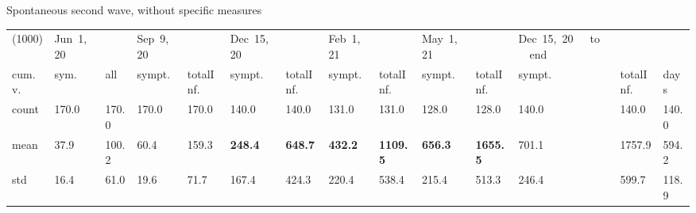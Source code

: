 \documentclass[8pt]{beamer}
\begin{document}
\begin{frame}{Spontaneous second wave, without specific measures}
\begin{table}[H]
\center
\tiny
\begin{tabular}{p{0.4cm}p{0.3cm}p{0.3cm}p{0.3cm}p{0.3cm}p{0.3cm}p{0.3cm}p{0.3cm}p{0.3cm}p{0.3cm}p{0.3cm}p{0.3cm}p{0.3cm}p{0.4cm}}
\toprule
(1000) &  Jun~1,~20 & &  Sep~9,~20 & & Dec~15,~20 & & Feb~1,~21 & & May~1,~21 & & Dec~15,~20~~~to~~~end  \\
cum.~v. &  sym. &  all &  sympt. &  totalInf. &  sympt. &  totalInf. &  sympt. &  totalInf. &  sympt. &  totalInf. &  sympt. &  totalInf.  & days\\
\midrule
count &    170.0 &                      170.0 &    170.0 &                      170.0 &    140.0 &                      140.0 &    131.0 &                      131.0 &    128.0 &                      128.0 &               140.0 &                   140.0 &  140.0 \\
mean  &     37.9 &                      100.2 &     60.4 &                      159.3 &    \textbf{248.4} &                      \textbf{648.7} &    \textbf{432.2} &                     \textbf{1109.5} &   \textbf{656.3} &                     \textbf{1655.5} &              701.1 &                  1757.9 &  594.2 \\
std   &     16.4 &                       61.0 &     19.6 &                       71.7 &    167.4 &                      424.3 &    220.4 &                      538.4 &    215.4 &                      513.3 &               246.4 &                   599.7 &  118.9 \\
\bottomrule
\end{tabular}

\label{selSpontWave2Tab}
\end{table}


\end{frame}
\end{document}
